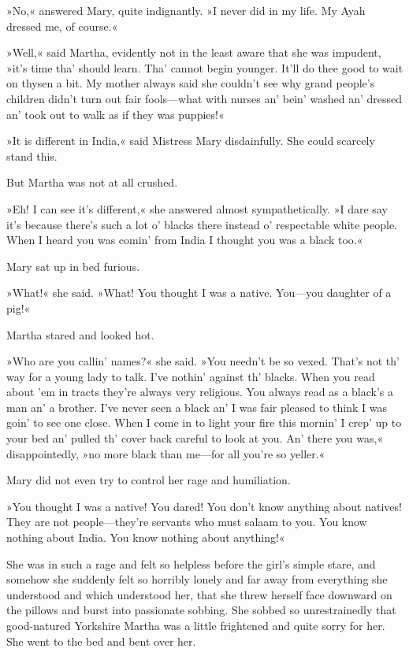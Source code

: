 »No,« answered Mary, quite indignantly. »I never did in my life. My Ayah dressed me, of course.«

»Well,« said Martha, evidently not in the least aware that she was impudent, »it's time tha' should learn. Tha' cannot begin younger. It'll do thee good to wait on thysen a bit. My mother always said she couldn't see why grand people's children didn't turn out fair fools—what with nurses an' bein' washed an' dressed an' took out to walk as if they was puppies!«

»It is different in India,« said Mistress Mary disdainfully. She could scarcely stand this.

But Martha was not at all crushed.

»Eh! I can see it's different,« she answered almost sympathetically. »I dare say it's because there's such a lot o' blacks there instead o' respectable white people. When I heard you was comin' from India I thought you was a black too.«

Mary sat up in bed furious.

»What!« she said. »What! You thought I was a native. You—you daughter of a pig!«

Martha stared and looked hot.

»Who are you callin' names?« she said. »You needn't be so vexed. That's not th' way for a young lady to talk. I've nothin' against th' blacks. When you read about 'em in tracts they're always very religious. You always read as a black's a man an' a brother. I've never seen a black an' I was fair pleased to think I was goin' to see one close. When I come in to light your fire this mornin' I crep' up to your bed an' pulled th' cover back careful to look at you. An' there you was,« disappointedly, »no more black than me—for all you're so yeller.«

Mary did not even try to control her rage and humiliation.

»You thought I was a native! You dared! You don't know anything about natives! They are not people—they're servants who must salaam to you. You know nothing about India. You know nothing about anything!«

She was in such a rage and felt so helpless before the girl's simple stare, and somehow she suddenly felt so horribly lonely and far away from everything she understood and which understood her, that she threw herself face downward on the pillows and burst into passionate sobbing. She sobbed so unrestrainedly that good-natured Yorkshire Martha was a little frightened and quite sorry for her. She went to the bed and bent over her.


